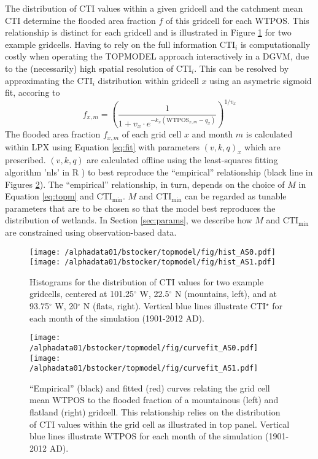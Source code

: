 The distribution of CTI values within a given gridcell and the catchment mean CTI determine the flooded area fraction $f$ of this gridcell for each WTPOS. This relationship is distinct for each gridcell and is illustrated in Figure \ref{fig:topmodel_example1} for two example gridcells. Having to rely on the full information CTI$_i$ is computationally costly when operating the TOPMODEL approach interactively in a DGVM, due to the (necessarily) high spatial resolution of CTI$_i$. This can be resolved by approximating the CTI$_i$ distribution within gridcell $x$ using an asymetric sigmoid fit, accoring to
\begin{equation}
f_{x,m} = \left( \frac{1} { 1+v_x\cdot e^{-k_x(\text{WTPOS}_{x,m}-q_x)} } \right) ^{1/v_x}
\label{eq:fit}
\end{equation}
The flooded area fraction $f_{x,m}$ of each grid cell $x$ and month $m$ is calculated within LPX using Equation \ref{eq:fit} with parameters $(v, k, q)_x$ which are prescribed. $(v, k, q)$ are calculated offline using the least-squares fitting algorithm 'nls' in R \citep{R}) to best reproduce the ``empirical'' relationship (black line in Figures \ref{fig:topmodel_example2}). The ``empirical'' relationship, in turn, depends on the choice of $M$ in Equation \ref{eq:topm} and CTI$_{\text{min}}$. $M$ and CTI$_{\text{min}}$ can be regarded as tunable parameters that are to be chosen so that the model best reproduces the distribution of wetlands. In Section \ref{sec:params}, we describe how $M$ and CTI$_{\text{min}}$ are constrained using observation-based data.

\begin{figure}[ht!]
  \texttt{[image: /alphadata01/bstocker/topmodel/fig/hist\_AS0.pdf]}
  \texttt{[image: /alphadata01/bstocker/topmodel/fig/hist\_AS1.pdf]}
\caption[CTI distribution for two example gridcells]{Histograms for the distribution of CTI values for two example gridcells, centered at 101.25$^{\circ}$ W, 22.5$^{\circ}$ N (mountains, left), and at 93.75$^{\circ}$ W, 20$^{\circ}$ N (flats, right). Vertical blue lines illustrate CTI$^{\star}$ for each month of the simulation (1901-2012 AD).}
\label{fig:topmodel_example1}
\end{figure}

\begin{figure}[ht!]
  \texttt{[image: /alphadata01/bstocker/topmodel/fig/curvefit\_AS0.pdf]}
  \texttt{[image: /alphadata01/bstocker/topmodel/fig/curvefit\_AS1.pdf]}
\caption[``Empirical'' and fitted relationship between WTPOS to the flooded area fraction for two example gridcells]{``Empirical'' (black) and fitted (red) curves relating the grid cell mean WTPOS to the flooded fraction of a mountainous (left) and flatland (right) gridcell. This relationship relies on the distribution of CTI values within the grid cell as illustrated in top panel. Vertical blue lines illustrate WTPOS for each month of the simulation (1901-2012 AD).}
\label{fig:topmodel_example2}
\end{figure}


